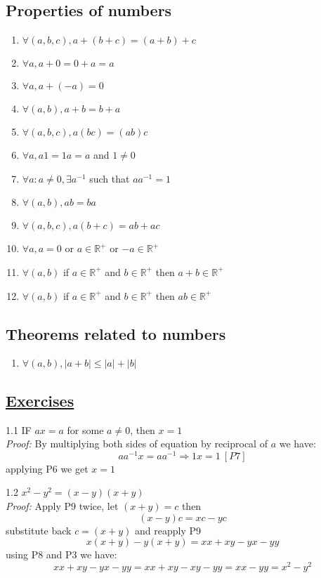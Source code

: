 \documentclass[a4paper, 11pt]{article}
\begin{document}
\subsection*{Properties of numbers}
\begin{enumerate}
  \item $\forall (a, b, c),  a + (b + c) = (a + b) + c$
  \item $\forall a,  a + 0 = 0 + a = a$
  \item $\forall a, a + (-a) = 0$
  \item $\forall (a, b), a + b = b + a$
  \item $\forall (a, b, c), a(bc) = (ab)c$
  \item $\forall a, a1 = 1a = a$ and $1 \ne 0$
  \item $\forall a: a \ne 0, \exists a^{-1}$ such that $aa^{-1} = 1$
  \item $\forall (a, b), ab = ba$
  \item $\forall (a, b, c), a(b + c) = ab + ac$
  \item $\forall a, a = 0$ or $a \in \mathbb{R}^+$ or $-a \in \mathbb{R}^+$
  \item $\forall (a, b)$ if $a \in \mathbb{R}^+$ and $b \in \mathbb{R}^+$ then $a + b \in \mathbb{R}^+$
  \item $\forall (a, b)$ if $a \in \mathbb{R}^+$ and $b \in \mathbb{R}^+$ then $ab \in \mathbb{R}^+$
\end{enumerate}

\subsection*{Theorems related to numbers}
\begin{enumerate}
  \item $\forall (a, b), |a + b| \leq |a| + |b|$
\end{enumerate}

\subsection*{\underline{Exercises}}
1.1 IF $ax = a$ for some $a \ne 0$, then $x = 1$\\
\emph{Proof:} 
By multiplying both sides of equation by reciprocal of $a$ we have:
$$aa^{-1}x = aa^{-1} \Rightarrow 1x = 1 \ [P7]$$
applying P6 we get $x = 1$

\hrulefill

1.2 $x^2 - y^2 = (x - y)(x + y)$\\
\emph{Proof:}
Apply P9 twice, let $(x + y) = c$ then 
$$(x - y)c = xc - yc$$
substitute back $c = (x + y)$ and reapply P9
$$x(x + y) - y(x + y) = xx + xy - yx - yy$$
using P8 and P3 we have:
$$xx + xy - yx - yy = xx + xy - xy - yy = xx - yy = x^2 - y^2$$
\end{document}

